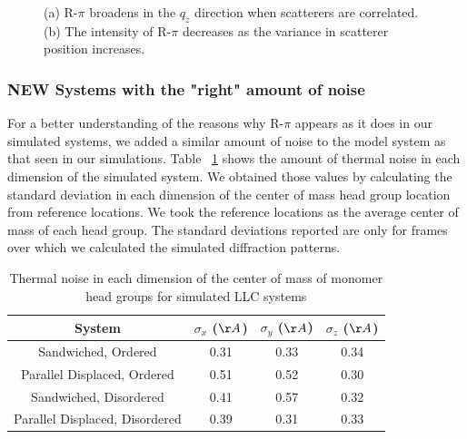 \documentclass{article}
\begin{document}
\begin{figure}[!htb]
\begin{subfigure}{0.45\textwidth}
  \caption{}\label{fig:correlation_decay}
  \end{subfigure}
  \caption{(a) R-$\pi$ broadens in the $q_z$ direction when scatterers are
	  correlated. (b) The intensity of R-$\pi$ decreases as the variance in
	  scatterer position increases.}\label{fig:correlation}
  \end{figure}

  \subsubsection{\textbf{NEW} Systems with the "right" amount of noise}

  For a better understanding of the reasons why R-$\pi$ appears as it does in
  our simulated systems, we added a similar amount of noise to the model system
  as that seen in our simulations. Table ~\ref{table:simulation_noise} shows the
  amount of thermal noise in each dimension of the simulated system. We obtained
  those values by calculating the standard deviation in each dimension of the
  center of mass head group location from reference locations. We took the
  reference locations as the average center of mass of each head group. The
  standard deviations reported are only for frames over which we calculated the
  simulated diffraction patterns. 

  \begin{table}
  \centering
  \begin{tabular}{c c c c}
  \toprule
  System                         &   $\sigma_x$ ($\AA$) &   $\sigma_y$ ($\AA$) & $\sigma_z$ ($\AA$) \\
  \midrule
  Sandwiched, Ordered            &      0.31            &     0.33             &     0.34           \\
  Parallel Displaced, Ordered    &      0.51            &     0.52             &     0.30           \\
  Sandwiched, Disordered         &      0.41            &     0.57             &     0.32           \\
  Parallel Displaced, Disordered &      0.39            &     0.31             &     0.33           \\
  \bottomrule
  \end{tabular}
  \caption{Thermal noise in each dimension of the center of mass of monomer head groups for 
  simulated LLC systems}\label{table:simulation_noise}
  \end{table}
\end{document}
